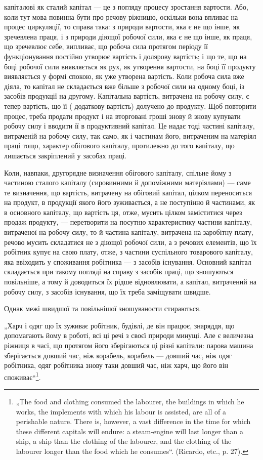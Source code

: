 \parcont{}  %
капіталові як сталий капітал — це з погляду процесу зростання вартости.
Або, коли тут мова повинна бути про речову ріжницю, оскільки вона
впливає на процес циркуляції, то справа така: з природи вартости, яка є
не що інше, як зречевлена праця, і з природи діющої робочої сили, яка
є не що інше, як праця, що зречевлює себе, випливає, що робоча сила
протягом періоду її функціонування постійно утворює вартість і долярову
вартість; і що те, що на боці робочої сили виявляється як рух, як
утворення вартости, на боці її продукту виявляється у формі спокою,
як уже утворена вартість. Коли робоча сила вже діяла, то капітал не
складається вже більше з робочої сили на одному боці, із засобів продукції
на другому. Капітальна вартість, витрачена на робочу силу, є тепер
вартість, що її (\dplus{} додаткову вартість) долучено до продукту. Щоб
повторити процес, треба продати продукт і на вторговані гроші знову й
знову купувати робочу силу і вводити її в продуктивний капітал. Це
надає тоді частині капіталу, витраченій на робочу силу, так само, як і частинам
його, витраченим на матеріял праці тощо, характер обігового капіталу,
протилежно до того капіталу, що лишається закріплений у засобах праці.

Коли, навпаки, другорядне визначення обігового капіталу, спільне
йому з частиною сталого капіталу (сировинними й допоміжними матеріялами)
— саме те визначення, що вартість, витрачену на обіговий капітал,
цілком переноситься на продукт, в продукції якого його зуживається, а
не поступінно й частинами, як в основного капіталу, що вартість ця,
отже, мусить цілком заміститися через продаж продукту, — перетворити
на посутню характеристику частини капіталу, витраченої на робочу силу,
то й частина капіталу, витрачена на заробітну плату, речово мусить
складатися не з діющої робочої сили, а з речових елементів, що їх робітник
купує на свою плату, отже, з частини суспільного товарового капіталу,
яка ввіходить у споживання робітника — з засобів існування.
Основний капітал складається при такому погляді на справу з засобів
праці, що зношуються повільніше, а тому й доводиться їх рідше відновлювати,
а капітал, витрачений на робочу силу, з засобів існування, що
їх треба заміщувати швидше.

Однак межі швидшої та повільнішої зношуваности стираються.

„Харч і одяг що їх зуживає робітник, будівлі, де він працює, знаряддя,
що допомагають йому в роботі, всі ці речі з своєї природи минущі.
Але є величезна ріжниця в часі, що протягом його зберігаються
ці різні капітали: парова машина зберігається довший час, ніж корабель,
корабель — довший час, ніж одяг робітника, одяг робітника знову таки
довший час, ніж харч, що його він споживає“\footnote{
„The food and clothing consumed the labourer, the buildings in which he
works, the implements with which his labour is assisted, are all of a perishable
nature. There is, however, a vast difference in the time for which these different
capitals will endure: a steam-engine will last longer than a ship, a ship than the
clothing of the labourer, and the clothing of the labourer longer than the food which
he consumes“. (Ricardo, etc., p. 27).
}.

